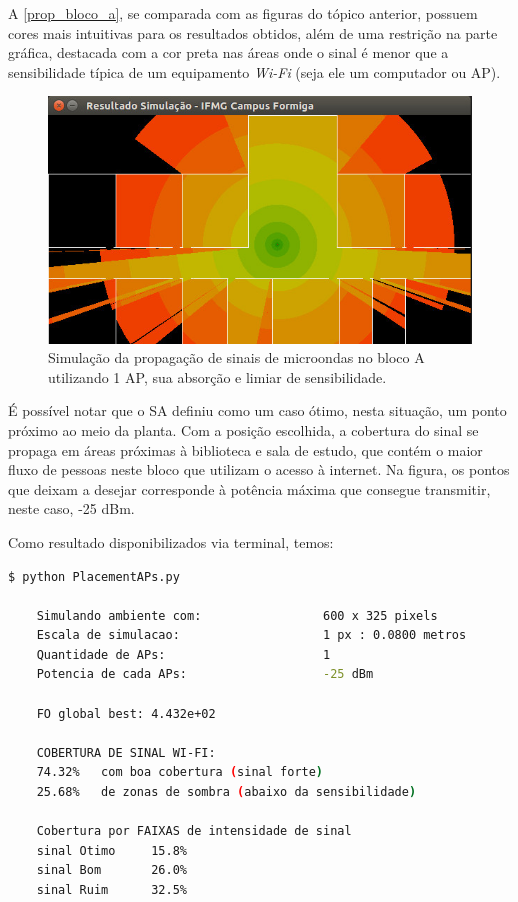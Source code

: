 \documentclass[
	12pt,				%
	openright,			%
	twoside,			%
	a4paper,			%
	english,			%
	french,				%
	spanish,			%
	brazil				%
	]{abntex2}
\begin{document}
A \autoref{prop_bloco_a}, se comparada com as figuras do tópico anterior, possuem cores mais intuitivas para os resultados obtidos, além de uma restrição na parte gráfica, destacada com a cor preta nas áreas onde o sinal é menor que a sensibilidade típica de um equipamento \textit{Wi-Fi} (seja ele um computador ou AP).

\begin{figure}[ht]
	\caption{\label{prop_bloco_a}Simulação da propagação de sinais de microondas no bloco A utilizando 1 AP, sua absorção e limiar de sensibilidade.}
	\begin{center}
		\includegraphics[scale=0.7]{images/prop-bloco-a-2.jpg}
	\end{center}
\end{figure}

É possível notar que o SA definiu como um caso ótimo, nesta situação, um ponto próximo ao meio da planta. Com a posição escolhida, a cobertura do sinal se propaga em áreas próximas à biblioteca e sala de estudo, que contém o maior fluxo de pessoas neste bloco que utilizam o acesso à internet. Na figura, os pontos que deixam a desejar corresponde à potência máxima que consegue transmitir, neste caso, -25 dBm.

\newpage

Como resultado disponibilizados via terminal, temos:

\begin{lstlisting}[language=bash]
	$ python PlacementAPs.py 
	
	Simulando ambiente com:                 600 x 325 pixels
	Escala de simulacao:                    1 px : 0.0800 metros
	Quantidade de APs:                      1
	Potencia de cada APs:                   -25 dBm
	
	FO global best: 4.432e+02
	
	COBERTURA DE SINAL WI-FI:
	74.32%   com boa cobertura (sinal forte)
	25.68%   de zonas de sombra (abaixo da sensibilidade)
	
	Cobertura por FAIXAS de intensidade de sinal
	sinal Otimo     15.8%
	sinal Bom       26.0%
	sinal Ruim      32.5%

\end{lstlisting}
\end{document}
